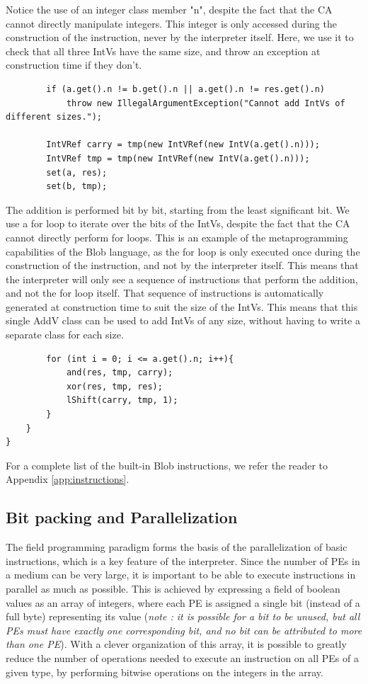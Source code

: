 \documentclass[11pt,a4paper]{report}
\begin{document}
Notice the use of an integer class member "n", despite the fact that the CA cannot directly manipulate integers. This integer is only accessed during the construction of the instruction, never by the interpreter itself. Here, we use it to check that all three IntVs have the same size, and throw an exception at construction time if they don't.
\begin{verbatim}
        if (a.get().n != b.get().n || a.get().n != res.get().n)
            throw new IllegalArgumentException("Cannot add IntVs of different sizes.");

        IntVRef carry = tmp(new IntVRef(new IntV(a.get().n)));
        IntVRef tmp = tmp(new IntVRef(new IntV(a.get().n)));
        set(a, res);
        set(b, tmp);
\end{verbatim}

The addition is performed bit by bit, starting from the least significant bit. We use a for loop to iterate over the bits of the IntVs, despite the fact that  the CA cannot directly perform for loops. This is an example of the metaprogramming capabilities of the Blob language, as the for loop is only executed once during the construction of the instruction, and not by the interpreter itself. This means that the interpreter will only see a sequence of instructions that  perform the addition, and not the for loop itself. That sequence of instructions is automatically generated at construction time to suit the size of the IntVs. This means that this single AddV class can be used to add IntVs of any size, without having to write a separate class for each size.
\begin{verbatim}
        for (int i = 0; i <= a.get().n; i++){
            and(res, tmp, carry);
            xor(res, tmp, res);
            lShift(carry, tmp, 1);
        }
    }
}
\end{verbatim}

For a complete list of the built-in Blob instructions, we refer the reader to Appendix \ref{app:instructions}.

\subsection{Bit packing and Parallelization}
\label{sec:parallelization}

The field programming paradigm forms the basis of the parallelization of basic instructions, which is a key feature of the interpreter. Since the number of PEs in a medium can be very large, it is important to be able to execute instructions in parallel as much as possible. This is achieved by expressing a field of boolean values as an array of integers, where each PE is assigned a single bit (instead of a full byte) representing its value (\textit{note : it is possible for a bit to be unused, but all PEs must have exactly one corresponding bit, and no bit can be attributed to more than one PE}). With a clever organization of this array, it is possible to greatly reduce the number of operations needed to execute an instruction on all PEs of a given type, by performing bitwise operations on the integers in the array.
\end{document}
